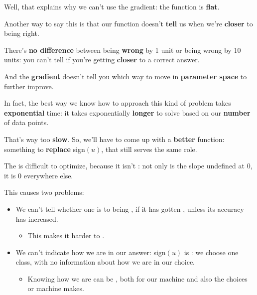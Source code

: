         Well, that explains why we can't use the gradient: the function is \textbf{flat}.
        
        Another way to say this is that our function doesn't \textbf{tell} us when we're \textbf{closer} to being right.
        
        There's \textbf{no difference} between being \textbf{wrong} by 1 unit or being wrong by 10 units: you can't tell if you're getting \textbf{closer} to a correct answer.
        
        And the \textbf{gradient} doesn't tell you which way to move in \textbf{parameter space} to further improve.
        
        In fact, the best way we know how to approach this kind of problem takes \textbf{exponential} time: it takes exponentially \textbf{longer} to solve based on our \textbf{number} of data points.
        
        That's way too \textbf{slow}. So, we'll have to come up with a \textbf{better} function: something to \textbf{replace} sign$(u)$, that still serves the same role.\\
        
        \begin{concept}
            The  is difficult to optimize, because it isn't : not only is the slope undefined at 0, it is 0 everywhere else.
            
            This causes two problems:
            
            \begin{itemize}
                \item We can't tell whether one  is  to being , if it has gotten , unless its accuracy has increased. 
                    \begin{itemize}
                        \item This makes it harder to .
                    \end{itemize}
                
                \item We can't indicate how  we are in our answer: sign$(u)$ is : we choose one class, with no information about how  we are in our choice.
                    \begin{itemize}
                        \item Knowing how  we are can be , both for  our machine and also  the choices or machine makes.
                    \end{itemize}
            \end{itemize}
        \end{concept}
        
